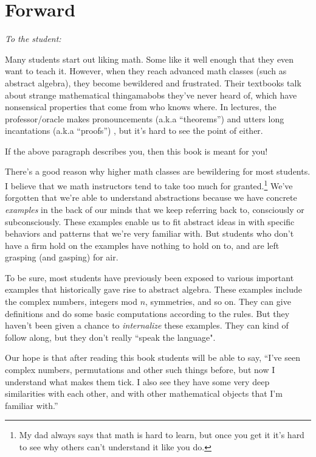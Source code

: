 \chapter*{Forward}

\emph{To the student:}
\medskip

Many students start out liking math. Some like it well enough that they even want to teach it. However, when they reach advanced math classes (such as abstract algebra), they become bewildered and frustrated. Their textbooks talk about strange mathematical thingamabobs they've never heard of, which have nonsensical properties that come from who knows where. In lectures, the professor/oracle  makes pronouncements (a.k.a ``theorems'') and utters long incantations (a.k.a ``proofs'') , but it's hard to see the point of either. 
\medskip

If the above paragraph describes you, then this book is meant for you!
\medskip

There's a good reason why higher math classes are bewildering for most students. I believe that we math instructors tend to take too much for granted.\footnote{My dad always says that math is hard to learn, but once you get  it it's hard to see why others can't understand it like you do.} We've forgotten that we're able to understand abstractions because we have concrete \emph{examples} in the back of our minds that we keep referring back to, consciously or subconsciously. These examples enable us to fit abstract ideas in with specific behaviors and patterns that we're very familiar with. But students who don't have a firm hold on the examples have nothing to hold on to, and are left grasping (and gasping) for air. 

To be sure, most students have previously been exposed to various important examples that historically gave rise to abstract algebra. These examples include the complex numbers, integers mod $n$, symmetries, and so on. They can give definitions and do some basic computations according to the rules. But they haven't been given a chance to \emph{internalize} these examples.  They can kind of follow along, but they don't really ``speak the language".

Our hope is that after reading this book students will be able to say, ``I've seen complex numbers, permutations and other such things before, but now I understand what makes them tick. I also see they have some very deep similarities with each other, and with other mathematical objects that I'm familiar with.'' 

